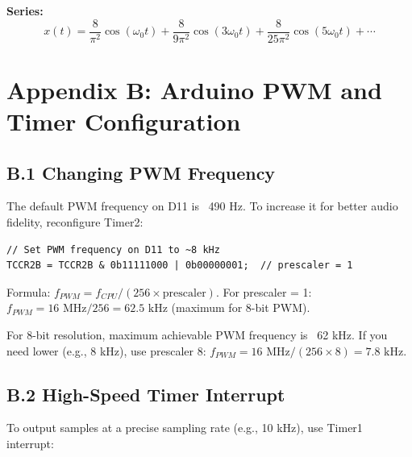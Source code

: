 \documentclass[11pt,letterpaper]{article}
\begin{document}
\noindent
\textbf{Series:}
\begin{equation}
x(t) = \frac{8}{\pi^2} \cos(\omega_0 t) + \frac{8}{9\pi^2} \cos(3\omega_0 t) + \frac{8}{25\pi^2} \cos(5\omega_0 t) + \cdots
\end{equation}

\clearpage

\section*{Appendix B: Arduino PWM and Timer Configuration}

\subsection*{B.1 Changing PWM Frequency}

The default PWM frequency on D11 is ~490 Hz. To increase it for better audio fidelity, reconfigure Timer2:

\begin{verbatim}
// Set PWM frequency on D11 to ~8 kHz
TCCR2B = TCCR2B & 0b11111000 | 0b00000001;  // prescaler = 1
\end{verbatim}

\noindent
Formula: $f_{PWM} = f_{CPU} / (256 \times \text{prescaler})$. For prescaler = 1: $f_{PWM} = 16 \text{ MHz} / 256 = 62.5 \text{ kHz}$ (maximum for 8-bit PWM).

For 8-bit resolution, maximum achievable PWM frequency is ~62 kHz. If you need lower (e.g., 8 kHz), use prescaler 8: $f_{PWM} = 16 \text{ MHz} / (256 \times 8) = 7.8 \text{ kHz}$.

\subsection*{B.2 High-Speed Timer Interrupt}

To output samples at a precise sampling rate (e.g., 10 kHz), use Timer1 interrupt:
\end{document}
